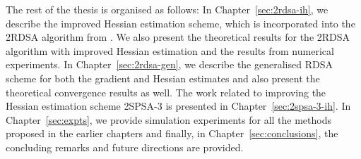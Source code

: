 The rest of the thesis is organised as follows: In Chapter~\ref{sec:2rdsa-ih}, we describe the improved Hessian estimation scheme, which is incorporated into the  2RDSA algorithm from \cite{prashanth2015rdsa}. We also present the theoretical results for the 2RDSA algorithm with  improved Hessian estimation and the results from numerical experiments. In Chapter~\ref{sec:2rdsa-gen}, we describe the generalised RDSA scheme for both the gradient and Hessian estimates and also present the theoretical convergence results as well. The work related to improving the Hessian estimation scheme 2SPSA-3 is presented in Chapter~\ref{sec:2spsa-3-ih}. In Chapter~\ref{sec:expts}, we provide simulation experiments for all the methods proposed in the earlier chapters and finally, in  Chapter~\ref{sec:conclusions}, the concluding remarks and future directions are provided.

